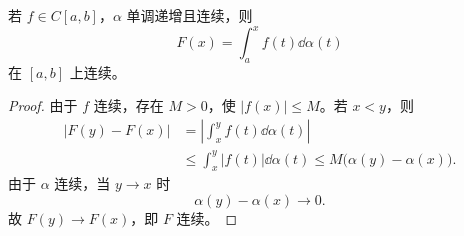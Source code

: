 \begin{proposition}\label{prop:upper-limit-continuity-stieltjes}
	若 $f\in C[a,b]$，$\alpha$ 单调递增且连续，则
	\[
	F(x)=\int_a^x f(t)\dd\alpha(t)
	\]
	在 $[a,b]$ 上连续。
\end{proposition}

\begin{proof}
	由于 $f$ 连续，存在 $M>0$，使 $|f(x)|\leq M$。若 $x<y$，则
	\[
	\begin{aligned}
		|F(y)-F(x)|
		&=\left|\int_x^y f(t)\dd\alpha(t)\right| \\
		&\leq \int_x^y |f(t)|\dd\alpha(t)
		\leq M\bigl(\alpha(y)-\alpha(x)\bigr).
	\end{aligned}
	\]
	由于 $\alpha$ 连续，当 $y\to x$ 时
	\[
	\alpha(y)-\alpha(x)\to0.
	\]
	故 $F(y)\to F(x)$，即 $F$ 连续。
\end{proof}

